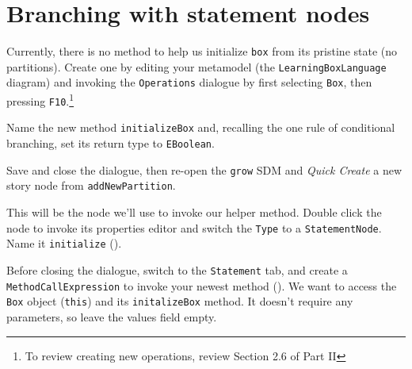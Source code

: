 \clearpage
\hypertarget{conBran vis}{}
\section{Branching with statement nodes}
\genHeader

\begin{stepbystep}

\item Currently, there is no method to help us initialize \texttt{box} from its pristine state (no partitions). Create one by editing
your metamodel (the \texttt{LearningBoxLanguage} diagram) and invoking the \texttt{Operations} dialogue by first selecting \texttt{Box}, then pressing
\texttt{F10}.\footnote{To review creating new operations, review Section 2.6 of Part II}

\item Name the new method \texttt{initializeBox} and, recalling the one rule of conditional branching, set its return type to
\texttt{EBoolean}.

\item Save and close the dialogue, then re-open the \texttt{grow} SDM and \emph{Quick Create} a new story node from
\texttt{addNewPartition}.

\item This will be the node we'll use to invoke our helper method. Double click the node to invoke its properties editor and switch the
\texttt{Type} to a \texttt{StatementNode}. Name it \texttt{initialize} ().

\item Before closing the dialogue, switch to the \texttt{Statement} tab, and create a \texttt{MethodCallExpression} to invoke your newest
method (). We want to access the \texttt{Box} object (\texttt{this}) and its \texttt{initalizeBox} method. It doesn't require any
parameters, so leave the values field empty. 


\end{stepbystep}
